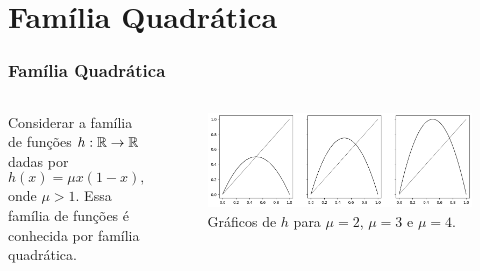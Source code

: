 \section{Família Quadrática}


\begin{frame}
\vspace{5pt}
\frametitle{Família Quadrática}
\begin{columns}
\column{\dimexpr\paperwidth-15pt}

Considerar a família de funções $h: \mathbb{R} \to \mathbb{R}$ dadas por
$$h(x) = \mu x(1-x),$$
onde $\mu > 1$.
Essa família de funções é conhecida por família quadrática.

\begin{figure}[!htb]
\centering
\includegraphics[scale=0.4]{images/h_2,3,4,5.png}
\caption{Gráficos de $h$ para $\mu = 2$, $\mu = 3$ e $\mu = 4$.}
\end{figure}

\end{columns}
\end{frame}
